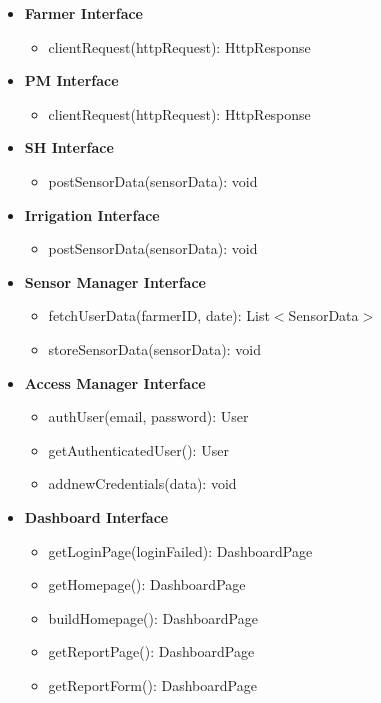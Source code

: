 \documentclass[10pt]{article} %
\begin{document}
\begin{itemize}
    \item \textbf{Farmer Interface}
    \begin{itemize}
        \item clientRequest(httpRequest): HttpResponse
    \end{itemize}
    \item \textbf{PM Interface}
    \begin{itemize}
        \item clientRequest(httpRequest): HttpResponse
    \end{itemize}
    \item \textbf{SH Interface}
    \begin{itemize}
        \item postSensorData(sensorData): void
    \end{itemize}
    \item \textbf{Irrigation Interface}
    \begin{itemize}
        \item postSensorData(sensorData): void
    \end{itemize}
    \item \textbf{Sensor Manager Interface}
    \begin{itemize}
        \item fetchUserData(farmerID, date): List$<$SensorData$>$
        \item storeSensorData(sensorData): void
    \end{itemize}
    \item \textbf{Access Manager Interface}
    \begin{itemize}
        \item authUser(email, password): User
        \item getAuthenticatedUser(): User
        \item addnewCredentials(data): void
    \end{itemize}
    \item \textbf{Dashboard Interface}
    \begin{itemize}
        \item getLoginPage(loginFailed): DashboardPage
        \item getHomepage(): DashboardPage
        \item buildHomepage(): DashboardPage
        \item getReportPage(): DashboardPage
        \item getReportForm(): DashboardPage

\end{itemize}
\end{itemize}
\end{document}
